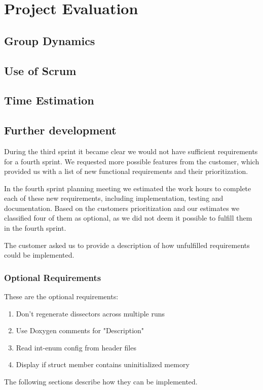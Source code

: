 \chapter{Project Evaluation}

\section{Group Dynamics}

\section{Use of Scrum}

\section{Time Estimation}


\section{Further development}
During the third sprint it became clear we would not have sufficient requirements for a fourth sprint. We requested more possible features from the customer, which provided us with a list of new functional requirements and their prioritization.

In the fourth sprint planning meeting we estimated the work hours to complete each of these new requirements, including implementation, testing and documentation. Based on the customers prioritization and our estimates we classified four of them as optional, as we did not deem it possible to fulfill them in the fourth sprint. 

The customer asked us to provide a description of how unfulfilled requirements could be implemented.

\subsection{Optional Requirements}
These are the optional requirements:
\begin{enumerate}
\item Don't regenerate dissectors across multiple runs
\item Use Doxygen comments for "Description"	
\item Read int-enum config from header files
\item Display if struct member contains uninitialized memory
\end {enumerate}
The following sections describe how they can be implemented.

